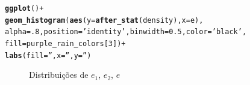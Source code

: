 \documentclass{homework}\usepackage[]{graphicx}\usepackage[]{color}
\makeatletter
\newcommand{\hlnum}[1]{\textcolor[rgb]{0.686,0.059,0.569}{#1}}%
\newcommand{\hlstr}[1]{\textcolor[rgb]{0.192,0.494,0.8}{#1}}%
\newcommand{\hlopt}[1]{\textcolor[rgb]{0,0,0}{#1}}%
\newcommand{\hlstd}[1]{\textcolor[rgb]{0.345,0.345,0.345}{#1}}%
\newcommand{\hlkwc}[1]{\textcolor[rgb]{0.333,0.667,0.333}{#1}}%
\newcommand{\hlkwd}[1]{\textcolor[rgb]{0.737,0.353,0.396}{\textbf{#1}}}%
\newenvironment{kframe}{%
 \def\at@end@of@kframe{}%
 \ifinner\ifhmode%
  \def\at@end@of@kframe{\end{minipage}}%
  \begin{minipage}{\columnwidth}%
 \fi\fi%
 \def\FrameCommand##1{\hskip\@totalleftmargin \hskip-\fboxsep
 \colorbox{shadecolor}{##1}\hskip-\fboxsep
     \hskip-\linewidth \hskip-\@totalleftmargin \hskip\columnwidth}%
 \MakeFramed {\advance\hsize-\width
   \@totalleftmargin\z@ \linewidth\hsize
   \@setminipage}}%
 {\par\unskip\endMakeFramed%
 \at@end@of@kframe}
\newenvironment{knitrout}{}{} %
\makeatother
\begin{document}
\begin{knitrout}
\begin{kframe}
\begin{alltt}
\hlkwd{ggplot}\hlstd{()} \hlopt{+}
  \hlkwd{geom_histogram}\hlstd{(}\hlkwd{aes}\hlstd{(}\hlkwc{y} \hlstd{=} \hlkwd{after_stat}\hlstd{(density),} \hlkwc{x} \hlstd{= e),}
                 \hlkwc{alpha} \hlstd{=} \hlnum{.8}\hlstd{,} \hlkwc{position} \hlstd{=} \hlstr{'identity'}\hlstd{,} \hlkwc{binwidth} \hlstd{=} \hlnum{0.5}\hlstd{,} \hlkwc{color} \hlstd{=} \hlstr{'black'}\hlstd{,}
                 \hlkwc{fill} \hlstd{= purple_rain_colors[}\hlnum{3}\hlstd{])} \hlopt{+}
  \hlkwd{labs}\hlstd{(}\hlkwc{fill} \hlstd{=} \hlstr{''}\hlstd{,} \hlkwc{x} \hlstd{=} \hlstr{''}\hlstd{,} \hlkwc{y} \hlstd{=} \hlstr{''}\hlstd{)}
\end{alltt}
\end{kframe}\begin{figure}
\caption[Distribuições de $e_1$, $e_2$, $e$]{Distribuições de $e_1$, $e_2$, $e$}\label{fig:Simul1}
\end{figure}

\end{knitrout}
\end{document}
